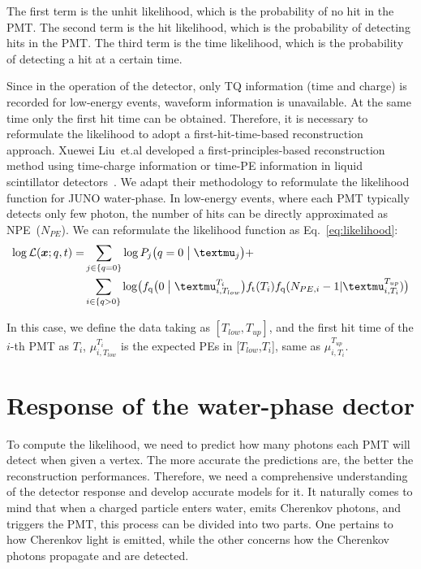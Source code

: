 The first term is the unhit likelihood, which is the probability of no hit in the PMT. The second term is the hit likelihood, which is the probability of detecting hits in the PMT. The third term is the time likelihood, which is the probability of detecting a hit at a certain time.

Since in the operation of the detector, only TQ information (time and charge) is recorded for low-energy events, waveform information is unavailable. At the same time only the first hit time can be obtained. Therefore, it is necessary to reformulate the likelihood to adopt a first-hit-time-based reconstruction approach. Xuewei Liu~et.al developed a first-principles-based reconstruction method using time-charge information or time-PE information in liquid scintillator detectors~\cite{Liu:2024cxo}. We adapt their methodology to reformulate the likelihood function for JUNO water-phase. In low-energy events, where each PMT typically detects only few photon, the number of hits can be directly approximated as NPE~($N_{PE}$). We can reformulate the likelihood function as Eq.~\eqref{eq:likelihood}:
\begin{equation}
	\begin{aligned}
		\log \mathcal{L}(\boldsymbol{x};{q},{t})= & \sum_{j \in \{q=0\}}\log P_j \bigl( q=0\bigm| \mu_j \bigr)+                                                                                                            \\
		                                          & \sum_{i \in \{q>0\}} \log \bigl( f_{\mathrm{q}}\bigl( 0 \bigm| \mu_{i,T_{low}}^{T_i} \bigr)f_{\mathrm{t}}(T_i)f_{\mathrm{q}}(N_{PE,i}-1|\mu_{i,T_{i}}^{T_{up}}) \bigr)
	\end{aligned}
	\label{eq:likelihood}
\end{equation}

In this case, we define the data taking as $[T_{low},T_{up}]$, and the first hit time of the $i$-th PMT as $T_{i}$, $\mu_{i,T_{low}}^{T_i}$ is the expected PEs in [$T_{low}$,${T_i}$], same as $\mu_{i,T_{i}}^{T_{up}}$.

\section{Response of the water-phase dector}
To compute the likelihood, we need to predict how many photons each PMT will detect when given a vertex. The more accurate the predictions are, the better the reconstruction performances. Therefore, we need a comprehensive understanding of the detector response and develop accurate models for it.
It naturally comes to mind that when a charged particle enters water, emits Cherenkov photons, and triggers the PMT, this process can be divided into two parts. One pertains to how Cherenkov light is emitted, while the other concerns how the Cherenkov photons propagate and are detected.


